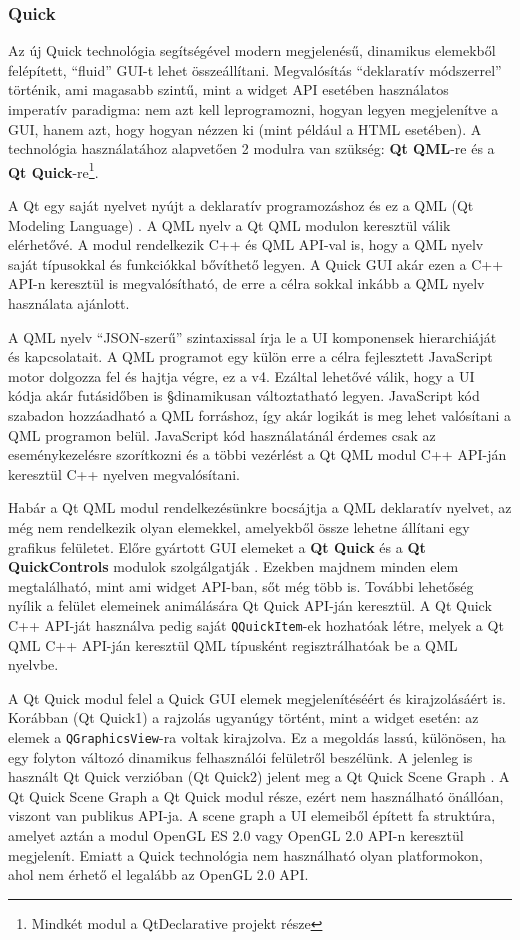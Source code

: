 \documentclass[12pt]{report}
\begin{document}
\subsubsection{Quick}
Az új Quick technológia segítségével modern megjelenésű, dinamikus elemekből felépített,
``fluid'' GUI-t lehet összeállítani. Megvalósítás ``deklaratív módszerrel'' történik, ami
magasabb szintű, mint a widget API esetében használatos imperatív paradigma: nem azt kell
leprogramozni, hogyan legyen megjelenítve a GUI, hanem azt, hogy hogyan nézzen ki
(mint például a HTML esetében). A technológia használatához alapvetően 2 modulra van
szükség: \textbf{Qt QML}-re és a \textbf{Qt Quick}-re\footnote{Mindkét modul a QtDeclarative
projekt része}.

A Qt egy saját nyelvet nyújt a deklaratív programozáshoz és ez a QML (Qt Modeling Language)
\cite{bib:qt-doc-qt-qml}. A QML nyelv a Qt QML modulon keresztül válik elérhetővé. A modul
rendelkezik C++ és QML API-val is, hogy a QML nyelv saját típusokkal és funkciókkal bővíthető
legyen. A Quick GUI akár ezen a C++ API-n keresztül is megvalósítható, de erre a célra
sokkal inkább a QML nyelv használata ajánlott.

A QML nyelv ``JSON-szerű'' szintaxissal írja le a UI komponensek hierarchiáját és
kapcsolatait. A QML programot egy külön erre a célra fejlesztett JavaScript motor dolgozza
fel és hajtja végre, ez a v4. Ezáltal lehetővé válik, hogy a UI kódja akár futásidőben is
§dinamikusan változtatható legyen. JavaScript kód szabadon hozzáadható a QML forráshoz, így
akár logikát is meg lehet valósítani a QML programon belül. JavaScript kód használatánál
érdemes csak az eseménykezelésre szorítkozni és a többi vezérlést a Qt QML modul C++ API-ján
keresztül C++ nyelven megvalósítani.

Habár a Qt QML modul rendelkezésünkre bocsájtja a QML deklaratív nyelvet, az még
nem rendelkezik olyan elemekkel, amelyekből össze lehetne állítani egy grafikus felületet.
Előre gyártott GUI elemeket a \textbf{Qt Quick} és a \textbf{Qt QuickControls} modulok
szolgálgatják \cite{bib:qt-doc-qt-quick}. Ezekben majdnem minden elem megtalálható, mint ami
widget API-ban, sőt még több is. További lehetőség nyílik a felület elemeinek animálására
Qt Quick API-ján keresztül. A Qt Quick C++ API-ját használva pedig saját
\texttt{QQuickItem}-ek hozhatóak létre, melyek a Qt QML C++ API-ján keresztül QML típusként
regisztrálhatóak be a QML nyelvbe.

A Qt Quick modul felel a Quick GUI elemek megjelenítéséért és kirajzolásáért is.
Korábban (Qt Quick1) a rajzolás ugyanúgy történt, mint a widget esetén: az elemek a
\texttt{QGraphicsView}-ra voltak kirajzolva. Ez a megoldás lassú, különösen, ha egy folyton
változó dinamikus felhasználói felületről beszélünk. A jelenleg is használt Qt Quick verzióban
(Qt Quick2) jelent meg a Qt Quick Scene Graph \cite{bib:qt-doc-qt-quick-scene-graph}.
A Qt Quick Scene Graph a Qt Quick modul része, ezért nem használható önállóan, viszont van
publikus API-ja. A scene graph a UI elemeiből épített fa struktúra, amelyet aztán a modul
OpenGL ES 2.0 vagy OpenGL 2.0 API-n keresztül megjelenít. Emiatt a Quick technológia nem
használható olyan platformokon, ahol nem érhető el legalább az OpenGL 2.0 API.
\end{document}

